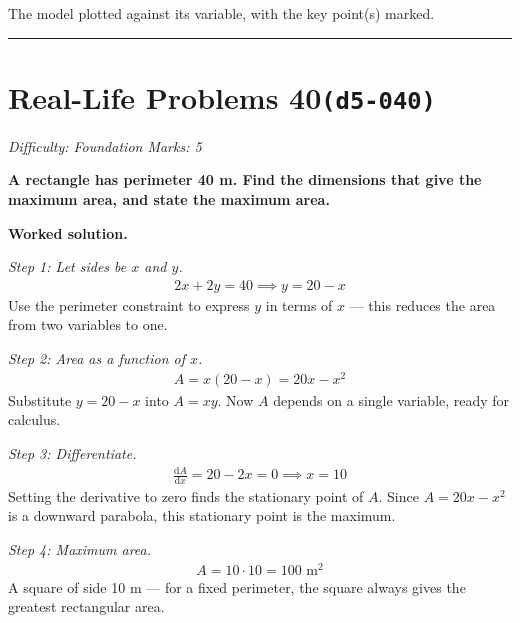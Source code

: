 \documentclass[11pt]{article}
\newcommand{\question}[1]{\par\medskip\noindent\textbf{#1}\par}
\begin{document}
\begin{center}
{
}
\end{center}
\small The model plotted against its variable, with the key point(s) marked.\normalsize

\medskip\hrule

\section*{Real-Life Problems 40\quad\small\texttt{(d5-040)}}
\textit{Difficulty: Foundation \quad\textbar\quad Marks: 5}

\question{A rectangle has perimeter 40 m. Find the dimensions that give the maximum area, and state the maximum area.}

\textbf{Worked solution.}

\textit{Step 1: Let sides be \( x \) and \( y \).}
\[\begin{gathered}
2x + 2y = 40 \implies y = 20 - x
\end{gathered}\]
Use the perimeter constraint to express \( y \) in terms of \( x \) --- this reduces the area from two variables to one.

\textit{Step 2: Area as a function of \( x \).}
\[\begin{gathered}
A = x(20 - x) = 20x - x^2
\end{gathered}\]
Substitute \( y = 20 - x \) into \( A = xy \). Now \( A \) depends on a single variable, ready for calculus.

\textit{Step 3: Differentiate.}
\[\begin{gathered}
\frac{\mathrm{d}A}{\mathrm{d}x} = 20 - 2x = 0 \implies x = 10
\end{gathered}\]
Setting the derivative to zero finds the stationary point of \( A \). Since \( A = 20x - x^2 \) is a downward parabola, this stationary point is the maximum.

\textit{Step 4: Maximum area.}
\[\begin{gathered}
A = 10 \cdot 10 = 100 \text{ m}^2
\end{gathered}\]
A square of side 10 m --- for a fixed perimeter, the square always gives the greatest rectangular area.
\end{document}
